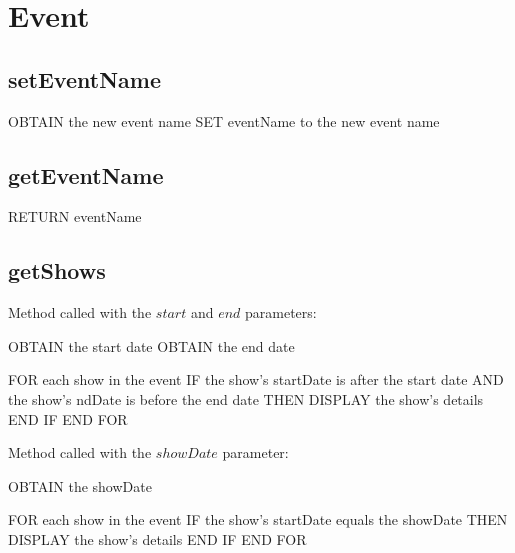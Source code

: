 \section{Event}

\subsection{setEventName}
\begin{pc}
OBTAIN the new event name
SET eventName to the new event name
\end{pc}

\subsection{getEventName}
\begin{pc}
RETURN eventName
\end{pc}

\subsection{getShows}
Method called with the $start$ and $end$ parameters:
\begin{pc}
OBTAIN the start date
OBTAIN the end date

FOR each show in the event
	IF the show's startDate is after the start date AND the show's ndDate is before the end date THEN
		DISPLAY the show's details
	END IF
END FOR
\end{pc}

Method called with the $showDate$ parameter:
\begin{pc}
OBTAIN the showDate

FOR each show in the event
	IF the show's startDate equals the showDate THEN
		DISPLAY the show's details
	END IF
END FOR
\end{pc}
